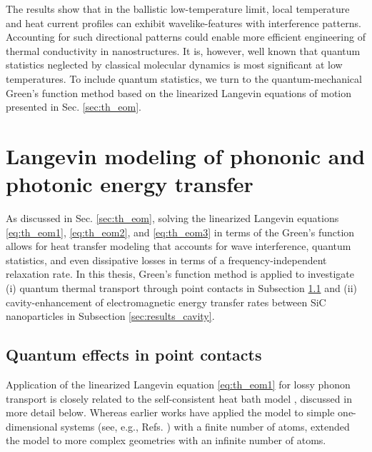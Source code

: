 The results show that in the ballistic low-temperature limit, local temperature and heat current profiles can exhibit wavelike-features with interference patterns. Accounting for such directional patterns could enable more efficient engineering of thermal conductivity in nanostructures. It is, however, well known that quantum statistics neglected by classical molecular dynamics is most significant at low temperatures. To include quantum statistics, we turn to the quantum-mechanical Green's function method based on the linearized Langevin equations of motion presented in Sec. \ref{sec:th_eom}.

\section{Langevin modeling of phononic and photonic energy transfer}
\label{sec:results_gf}

As discussed in Sec. \ref{sec:th_eom}, solving the linearized Langevin equations \eqref{eq:th_eom1}, \eqref{eq:th_eom2}, and \eqref{eq:th_eom3} in terms of the Green's function allows for heat transfer modeling that accounts for wave interference, quantum statistics, and even dissipative losses in terms of a frequency-independent relaxation rate. In this thesis, Green's function method is applied to investigate (i) quantum thermal transport through point contacts in Subsection \ref{sec:results_schb} and (ii) cavity-enhancement of electromagnetic energy transfer rates between SiC nanoparticles in Subsection \ref{sec:results_cavity}. 

\subsection{Quantum effects in point contacts}
\label{sec:results_schb}

Application of the linearized Langevin equation \eqref{eq:th_eom1} for lossy phonon transport is closely related to the self-consistent heat bath model \cite{bolsterli70}, discussed in more detail below. Whereas earlier works have applied the model to simple one-dimensional systems (see, e.g., Refs. \cite{bolsterli70,visscher75,dhar03,dhar06,segal09,bandyopadhyay11}) with a finite number of atoms,  extended the model to more complex geometries with an infinite number of atoms.  

